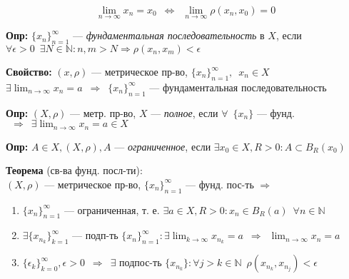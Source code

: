 \documentclass[12pt, letterpaper, twoside]{article}
\begin{document}
\vspace*{0.4cm}
\noindent
\[\lim_{n \rightarrow \infty} x_n = x_0 \enspace \Leftrightarrow \enspace \lim_{n \rightarrow \infty} \rho (x_n, x_0) = 0\]

\vspace*{0.3cm}
\noindent
\textbf{Опр:} \(\{x_n\}^{\infty}_{n = 1}\) --- \textit{фундаментальная последовательность} в \(X\), если \(\forall \epsilon > 0 \enspace \exists N \in \mathbb{N} : n, m > N \Rightarrow \rho (x_n, x_m) < \epsilon\) 
    
\vspace*{0.3cm}
\noindent
\textbf{Свойство:} \((x, \rho)\) --- метрическое пр-во, \(\{x_n\}^{\infty}_{n = 1}, \enspace x_n \in X\) \\
\(\exists \lim_{n \rightarrow \infty} x_n = a \enspace \Rightarrow \enspace \{x_n\}^{\infty}_{n = 1}\) --- фундаментальная последовательность

\vspace*{0.3cm}
\noindent
\textbf{Опр:} \((X, \rho)\) --- метр. пр-во, \(X\) --- \textit{полное}, если \(\forall \enspace \{x_n\}\) --- фунд. \(\enspace \Rightarrow \enspace \exists \lim_{n \rightarrow \infty} x_n = a \in X\)

\vspace*{0.3cm}
\noindent
\textbf{Опр:} \(A \in X, (X, \rho), A\) --- \textit{ограниченное}, если \(\exists x_0 \in X, R > 0: A \subset B_R(x_0)\)

\vspace*{0.3cm}
\noindent
\textbf{Теорема} (св-ва фунд. посл-ти): \\
\((X, \rho)\) --- метрическое пр-во, \(\{x_n\}^{\infty}_{n = 1}\) --- фунд. пос-ть \(\Rightarrow\)
\begin{enumerate}
    \item \(\{x_n\}^{\infty}_{n = 1}\) --- ограниченная, т. е. \(\exists a \in X, R > 0 : x_n \in B_R(a) \enspace \forall n \in \mathbb{N}\)
    \item \(\exists \{x_{n_k}\}^{\infty}_{k = 1}\) --- подп-ть \(\{x_n\}^{\infty}_{n = 1}: \exists \lim_{k \rightarrow \infty} x_{n_k} = a \enspace \Rightarrow \enspace \lim_{n \rightarrow \infty} x_n = a\)
    \item \(\{\epsilon_k\}^{\infty}_{k = 0}, \epsilon > 0 \enspace \Rightarrow \enspace \exists\) подпос-ть \(\{x_{n_k}\}: \forall j > k \in \mathbb{N} \enspace \rho (x_{n_k}, x_{n_j}) < \epsilon\)
\end{enumerate}
    
\end{document}
